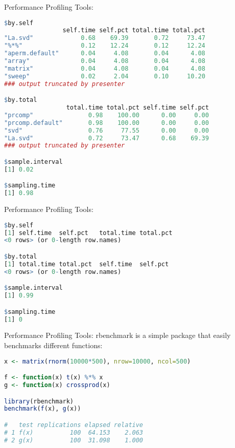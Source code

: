 \begin{frame}
  \begin{block}{Performance Profiling Tools: }
  \vspace{-.5cm}
\begin{lstlisting}[language=R]
$by.self
                self.time self.pct total.time total.pct
"La.svd"             0.68    69.39       0.72     73.47
"%*%"                0.12    12.24       0.12     12.24
"aperm.default"      0.04     4.08       0.04      4.08
"array"              0.04     4.08       0.04      4.08
"matrix"             0.04     4.08       0.04      4.08
"sweep"              0.02     2.04       0.10     10.20
### output truncated by presenter

$by.total
                 total.time total.pct self.time self.pct
"prcomp"               0.98    100.00      0.00     0.00
"prcomp.default"       0.98    100.00      0.00     0.00
"svd"                  0.76     77.55      0.00     0.00
"La.svd"               0.72     73.47      0.68    69.39
### output truncated by presenter

$sample.interval
[1] 0.02

$sampling.time
[1] 0.98
\end{lstlisting}
  \end{block}
\end{frame}



\begin{frame}[fragile]
  \begin{block}{Performance Profiling Tools: }
  \vspace{-.5cm}
\begin{lstlisting}[language=R]
$by.self
[1] self.time  self.pct   total.time total.pct 
<0 rows> (or 0-length row.names)

$by.total
[1] total.time total.pct  self.time  self.pct  
<0 rows> (or 0-length row.names)

$sample.interval
[1] 0.99

$sampling.time
[1] 0
\end{lstlisting}
  \end{block}
\end{frame}



\begin{frame}[fragile]
  \begin{block}{Performance Profiling Tools: rbenchmark}
   is a simple package that easily benchmarks different 
functions:
\begin{lstlisting}[language=R]
x <- matrix(rnorm(10000*500), nrow=10000, ncol=500)

f <- function(x) t(x) %*% x
g <- function(x) crossprod(x)

library(rbenchmark)
benchmark(f(x), g(x))

#   test replications elapsed relative
# 1 f(x)          100  64.153    2.063
# 2 g(x)          100  31.098    1.000
\end{lstlisting}
  \end{block}
\end{frame}

